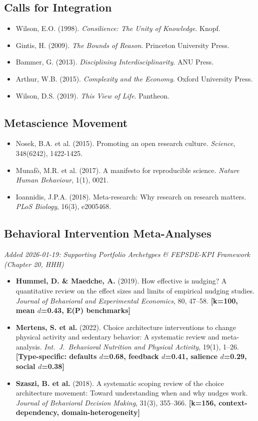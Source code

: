 \subsection{Calls for Integration}
\begin{itemize}[nosep]
\item Wilson, E.O. (1998). \textit{Consilience: The Unity of Knowledge}. Knopf.
\item Gintis, H. (2009). \textit{The Bounds of Reason}. Princeton University Press.
\item Bammer, G. (2013). \textit{Disciplining Interdisciplinarity}. ANU Press.
\item Arthur, W.B. (2015). \textit{Complexity and the Economy}. Oxford University Press.
\item Wilson, D.S. (2019). \textit{This View of Life}. Pantheon.
\end{itemize}

\subsection{Metascience Movement}
\begin{itemize}[nosep]
\item Nosek, B.A. et al. (2015). Promoting an open research culture. \textit{Science}, 348(6242), 1422-1425.
\item Munafò, M.R. et al. (2017). A manifesto for reproducible science. \textit{Nature Human Behaviour}, 1(1), 0021.
\item Ioannidis, J.P.A. (2018). Meta-research: Why research on research matters. \textit{PLoS Biology}, 16(3), e2005468.
\end{itemize}

\subsection{Behavioral Intervention Meta-Analyses}
\textit{Added 2026-01-19: Supporting Portfolio Archetypes \& FEPSDE-KPI Framework (Chapter 20, HHH)}
\begin{itemize}[nosep]
\item \textbf{Hummel, D. \& Maedche, A.} (2019). How effective is nudging? A quantitative review on the effect sizes and limits of empirical nudging studies. \textit{Journal of Behavioral and Experimental Economics}, 80, 47--58. \textbf{[k=100, mean $d$=0.43, E(P) benchmarks]}
\item \textbf{Mertens, S. et al.} (2022). Choice architecture interventions to change physical activity and sedentary behavior: A systematic review and meta-analysis. \textit{Int.\ J.\ Behavioral Nutrition and Physical Activity}, 19(1), 1--26. \textbf{[Type-specific: defaults $d$=0.68, feedback $d$=0.41, salience $d$=0.29, social $d$=0.38]}
\item \textbf{Szaszi, B. et al.} (2018). A systematic scoping review of the choice architecture movement: Toward understanding when and why nudges work. \textit{Journal of Behavioral Decision Making}, 31(3), 355--366. \textbf{[k=156, context-dependency, domain-heterogeneity]}
\end{itemize}

